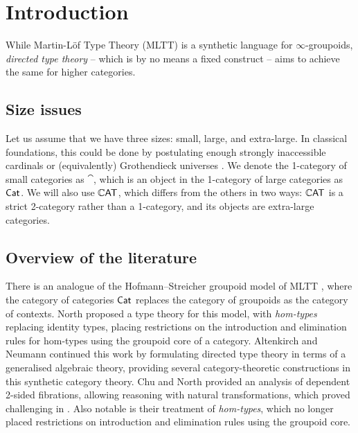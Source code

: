 \section*{Introduction}

While Martin-L\"of Type Theory (MLTT) is a synthetic language for $\infty$-groupoids,
\emph{directed type theory} -- which is by no means a fixed construct -- 
aims to achieve the same for higher categories.

\subsection*{Size issues}

Let us assume that we have three sizes: small, large, and extra-large.
In classical foundations, this could be done by postulating enough
strongly inaccessible cardinals or
(equivalently) Grothendieck universes \cite{bourbaki1972}.
We denote the 1-category of small categories as $\cat$,
which is an object in the 1-category of large categories as $\mathsf{Cat}$.
We will also use $\mathbb{C}\mathsf{AT}$, which differs from the others in two ways:
$\mathbb{C}\mathsf{AT}$ is a strict 2-category rather than a 1-category,
and its objects are extra-large categories.

\subsection*{Overview of the literature}

There is an analogue of the Hofmann--Streicher groupoid model of MLTT \cite{hofmann1995},
where the category of categories $\mathsf{Cat}$ replaces the category of groupoids
as the category of contexts.
North \cite{north2019} proposed a type theory for this model,
with \emph{hom-types} replacing identity types,
placing restrictions on
the introduction and elimination rules for hom-types using the groupoid core of a category.
Altenkirch and Neumann \cite{altenkirch2024} continued this work by
formulating directed type theory in terms of a generalised algebraic theory,
providing several category-theoretic constructions in this synthetic category theory.
Chu and North \cite{rivera2026} provided an analysis of dependent 2-sided fibrations,
allowing reasoning with natural transformations,
which proved challenging in \cite{altenkirch2024}.
Also notable is their treatment of \emph{hom-types},
which no longer placed restrictions on introduction and elimination rules
using the groupoid core.

